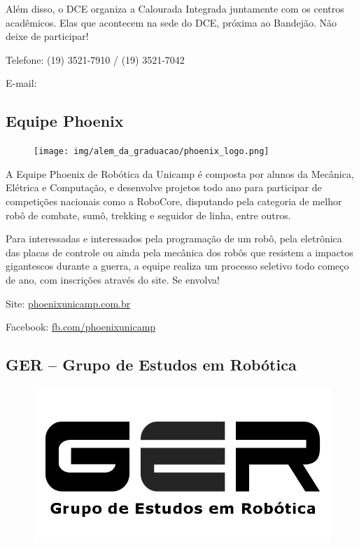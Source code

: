 Além disso, o DCE organiza a Calourada Integrada juntamente com os centros
acadêmicos. Elas que acontecem na sede do DCE, próxima ao Bandejão. Não deixe
de participar!

\begin{compactitemize}
\item Telefone: (19) 3521-7910 / (19) 3521-7042
\item E-mail: 
\end{compactitemize}

\subsection{Equipe Phoenix}

\begin{figure}[h!]
  \centering
  \texttt{[image: img/alem\_da\_graduacao/phoenix\_logo.png]}
\end{figure}

A Equipe Phoenix de Robótica da Unicamp é composta por alunos da Mecânica,
Elétrica e Computação, e desenvolve projetos todo ano para participar de
competições nacionais como a RoboCore, disputando pela categoria de melhor robô
de combate, sumô, trekking e seguidor de linha, entre outros.

Para interessadas e interessados pela programação de um robô,  pela eletrônica
das placas de controle ou ainda pela mecânica dos robôs que resistem a impactos
gigantescos durante a guerra, a equipe realiza um processo seletivo todo começo
de ano, com inscrições através do site. Se envolva!

\begin{compactitemize}
\item Site: \url{phoenixunicamp.com.br}
\item Facebook: \url{fb.com/phoenixunicamp}
\end{compactitemize}

\subsection{GER -- Grupo de Estudos em Robótica}

\begin{figure}[h!]
    \centering
    \includegraphics[width=.35\textwidth]{img/alem_da_graduacao/ger_logo.jpg}
\end{figure}

